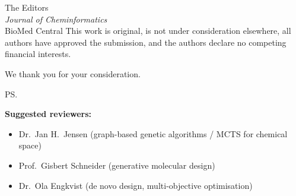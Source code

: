 \documentclass[10pt,a4paper]{letter}
\begin{document}
\begin{letter}{%
  The Editors \\
  \textit{Journal of Cheminformatics} \\
  BioMed Central
}
This work is original, is not under consideration elsewhere, all authors have approved the submission, and the authors declare no competing financial interests.

\closing{We thank you for your consideration.}

\ps{%
\textbf{Suggested reviewers:}\\
\begin{itemize}[leftmargin=*, itemsep=0pt, topsep=0pt]
  \item Dr.\ Jan H.\ Jensen (graph-based genetic algorithms / MCTS for chemical space)
  \item Prof.\ Gisbert Schneider (generative molecular design)
  \item Dr.\ Ola Engkvist (de novo design, multi-objective optimisation)
\end{itemize}
}

\end{letter}
\end{document}
